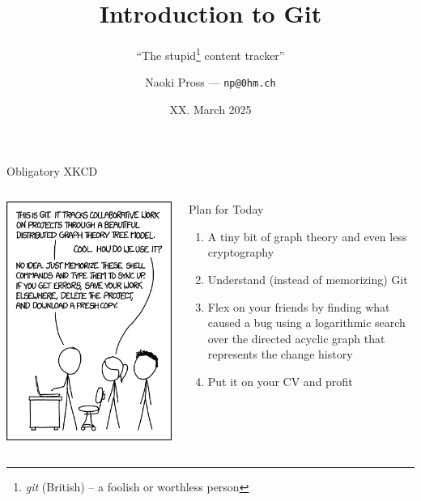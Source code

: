 \documentclass[xetex]{beamer}
\title{
  Introduction to Git
}
\subtitle{
  ``The stupid\footnote{
    \emph{git} (British) -- a foolish or worthless person}
  content tracker''
}
\author{
  Naoki Pross --- \texttt{np@0hm.ch}
}
\institute{}
\date{XX. March 2025}
\begin{document}
\frame{\titlepage}

\begin{frame}{Obligatory XKCD}
  \begin{columns}
    \begin{column}{.5\linewidth}
      \includegraphics[width=\linewidth]{pic/xkcd1597}
    \end{column}
    \begin{column}{.5\linewidth}
      \begin{alertblock}{Plan for Today}
        \begin{enumerate}
          \item A tiny bit of graph theory and even less cryptography
          \item Understand (instead of memorizing) Git
          \item Flex on your friends by finding what caused a bug using a
            logarithmic search over the directed acyclic graph that represents
            the change history
          \item Put it on your CV and profit
        \end{enumerate}
      \end{alertblock}
    \end{column}
  \end{columns}
\end{frame}
\end{document}
